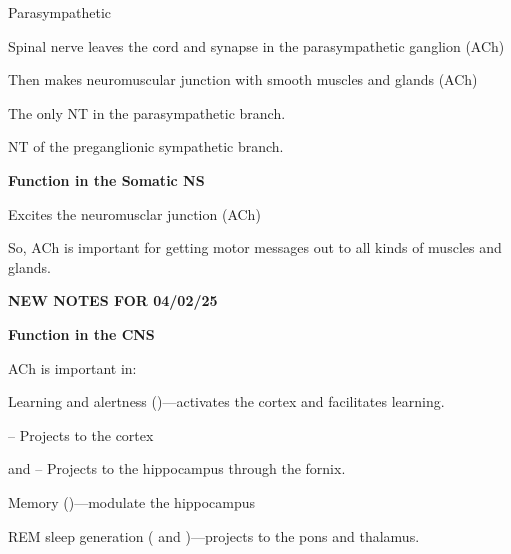 \begin{coloredlist}
\begin{coloredlist}
\begin{coloredlist}
\begin{coloredlist}
            \end{coloredlist}
            \item Parasympathetic
            \begin{coloredlist}
                \item Spinal nerve leaves the cord and synapse in the parasympathetic ganglion (ACh)
                \item Then makes neuromuscular junction with smooth muscles and glands (ACh)
            \end{coloredlist}
            \item The only NT in the parasympathetic branch.
            \item NT of the preganglionic sympathetic branch.
        \end{coloredlist}
        \item \textbf{Function in the Somatic NS}
        \begin{coloredlist}
            \item Excites the neuromusclar junction (ACh)
            \item So, ACh is important for getting motor messages out to all kinds of muscles and glands.
        \end{coloredlist}
        \begin{center}
            \textbf{NEW NOTES FOR 04/02/25} \\
            \hrulefill
        \end{center}
        \item \textbf{Function in the CNS}
        \begin{coloredlist}
            \item ACh is important in:
            \begin{coloredlist}
                \item Learning and alertness ()---activates the cortex and facilitates learning.
                    \begin{coloredlist}
                        \item {} -- Projects to the cortex
                        \item {} and  -- Projects to the hippocampus through the fornix.
                    \end{coloredlist}
                \item Memory ()---modulate the hippocampus
                \item REM sleep generation ( and )---projects to the pons and thalamus.

\end{coloredlist}
\end{coloredlist}
\end{coloredlist}
\end{coloredlist}
